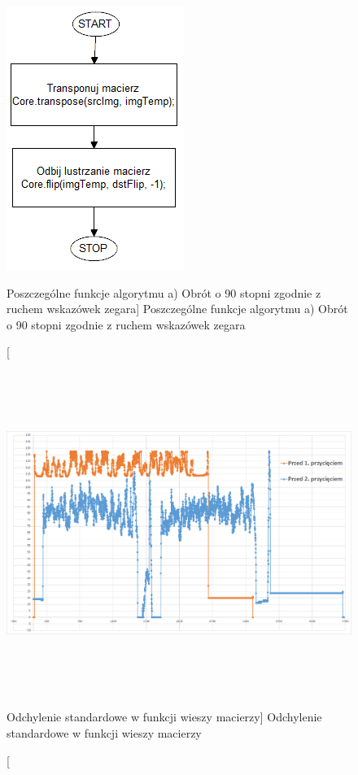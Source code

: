 \documentclass[a4paper,12pt]{article}
\begin{document}
    		    \begin{figure}[!ht]  
    			    \begin{center}
    				    \includegraphics[] {image//algorithm//cutBlackAreaPredv2.png} 
    			    \end{center}
    			    \caption
            			[Poszczególne funkcje algorytmu a) Obrót o 90 stopni zgodnie z ruchem wskazówek zegara]  
        	    		{Poszczególne funkcje algorytmu a) Obrót o 90 stopni zgodnie z ruchem wskazówek zegara}
    		    \end{figure}
			    
			
		        
		        \newpage
		        
			    
	        
    			\begin{figure}[!ht]  
    			    \begin{center}
    				    \includegraphics[height=10.5cm, frame] {image//practicalPart//stdDevCutBlackArea.png} 
    			    \end{center}
    			    \caption
            			[Odchylenie standardowe w funkcji wieszy macierzy] 
            			{Odchylenie standardowe w funkcji wieszy macierzy}  
    		    \end{figure}
			
\end{document}
